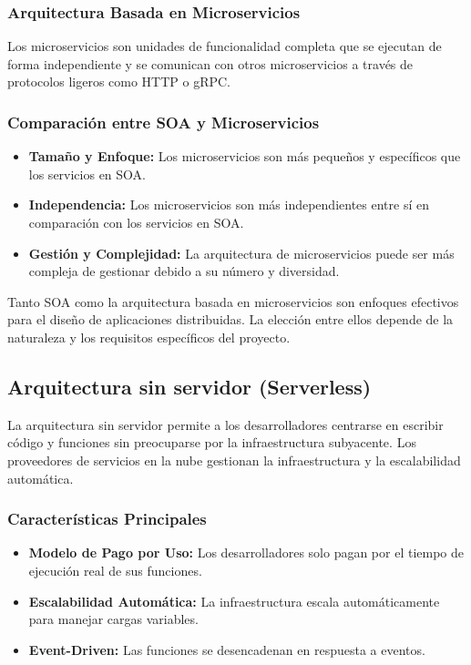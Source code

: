 	\subsubsection{Arquitectura Basada en Microservicios}
	Los microservicios son unidades de funcionalidad completa que se ejecutan de forma independiente y se comunican con otros microservicios a través de protocolos ligeros como HTTP o gRPC.
	
	\subsubsection{Comparación entre SOA y Microservicios}
	\begin{itemize}
		\item \textbf{Tamaño y Enfoque:} Los microservicios son más pequeños y específicos que los servicios en SOA.
		\item \textbf{Independencia:} Los microservicios son más independientes entre sí en comparación con los servicios en SOA.
		\item \textbf{Gestión y Complejidad:} La arquitectura de microservicios puede ser más compleja de gestionar debido a su número y diversidad.
	\end{itemize}
	
	\begin{tcolorbox}[colback=yellow!10!white, colframe=blue!50!black, title=Resumiendo, coltitle=white]
		Tanto SOA como la arquitectura basada en microservicios son enfoques efectivos para el diseño de aplicaciones distribuidas. La elección entre ellos depende de la naturaleza y los requisitos específicos del proyecto.
	\end{tcolorbox}
	
	\subsection{Arquitectura sin servidor (Serverless)}
	La arquitectura sin servidor permite a los desarrolladores centrarse en escribir código y funciones sin preocuparse por la infraestructura subyacente. Los proveedores de servicios en la nube gestionan la infraestructura y la escalabilidad automática.
	
	\subsubsection{Características Principales}
	\begin{itemize}
		\item \textbf{Modelo de Pago por Uso:} Los desarrolladores solo pagan por el tiempo de ejecución real de sus funciones.
		\item \textbf{Escalabilidad Automática:} La infraestructura escala automáticamente para manejar cargas variables.
		\item \textbf{Event-Driven:} Las funciones se desencadenan en respuesta a eventos.
	\end{itemize}
	
